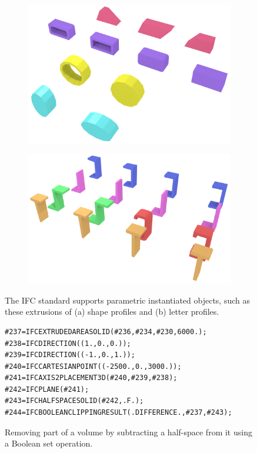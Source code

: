 \begin{figure}[htbp]
\centering
\begin{subfigure}[b]{0.45\linewidth}
\includegraphics[width=\linewidth]{figs/profiles}%
\label{subfig:profiles}
\end{subfigure}
\quad
\begin{subfigure}[b]{0.45\linewidth}
\includegraphics[width=\linewidth]{figs/letter_profiles}%
\label{subfig:letter-profiles}
\end{subfigure}
\caption[The IFC standard supports parametric instantiated objects]{The IFC standard supports parametric instantiated objects, such as these extrusions of (a) shape profiles and (b) letter profiles.}%
\label{fig:profiles}
\end{figure}

\begin{figure}[htbp]
\begin{lstlisting}[frame=single]
#237=IFCEXTRUDEDAREASOLID(#236,#234,#230,6000.);
#238=IFCDIRECTION((1.,0.,0.));
#239=IFCDIRECTION((-1.,0.,1.));
#240=IFCCARTESIANPOINT((-2500.,0.,3000.));
#241=IFCAXIS2PLACEMENT3D(#240,#239,#238);
#242=IFCPLANE(#241);
#243=IFCHALFSPACESOLID(#242,.F.);
#244=IFCBOOLEANCLIPPINGRESULT(.DIFFERENCE.,#237,#243);
\end{lstlisting}
\caption[Removing part of a volume using a Boolean set operation]{Removing part of a volume by subtracting a half-space from it using a Boolean set operation.}%
\label{fig:csg}
\end{figure}

